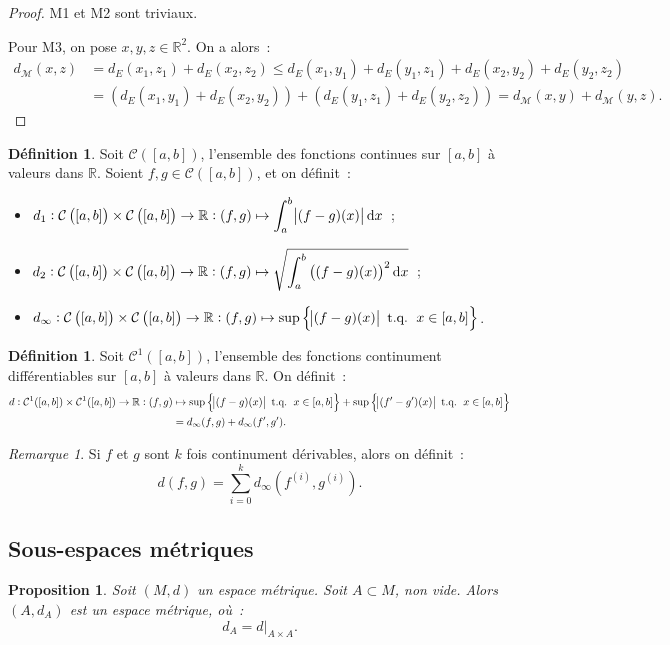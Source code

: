 \documentclass{report}
\newtheorem{prp}[thm]{Proposition}
\theoremstyle{definition}
\newtheorem{déf}[thm]{Définition}
\theoremstyle{remark}
\newtheorem*{rmq}{Remarque}
\DeclareMathOperator{\tq}{\text{ t.q. }}
\newcommand{\cont}[2]{\mathcal C\left(\left[#1, #2\right]\right)}
\newcommand{\restr}[2]{\left.#1\right|_{#2}}
\newcommand{\R}{\mathbb R}
\begin{document}
		\begin{proof} M1 et M2 sont triviaux.

		Pour M3, on pose $x, y, z \in \R^2$. On a alors~:
		\begin{align*}
			d_{\mathcal M}(x, z) &= d_E(x_1, z_1) + d_E(x_2, z_2) \leq d_E(x_1, y_1) + d_E(y_1, z_1) + d_E(x_2, y_2) + d_E(y_2, z_2) \\
			&= \left(d_E(x_1, y_1) + d_E(x_2, y_2)\right) + \left(d_E(y_1, z_1) + d_E(y_2, z_2)\right) = d_{\mathcal M}(x, y) + d_{\mathcal M}(y, z).
		\end{align*}
		\end{proof}

		\begin{déf} Soit $\cont ab$, l'ensemble des fonctions continues sur $[a, b]$ à valeurs dans $\R$. Soient $f, g \in \cont ab$, et on définit~:
		\begin{itemize}
			\item $d_1 : \cont ab \times \cont ab \to \R : (f, g) \mapsto \displaystyle\int_a^b\abs {(f-g)(x)}\dif x$~;
			\item $d_2 : \cont ab \times \cont ab \to \R : (f, g) \mapsto \displaystyle\sqrt{\int_a^b\left((f-g)(x)\right)^2\dif x}$~;
			\item $d_\infty : \cont ab \times \cont ab \to \R : (f, g) \mapsto \sup\left\{\abs {(f-g)(x)} \tq x \in [a, b]\right\}$.
		\end{itemize}
		\end{déf}

		\begin{déf} Soit $\mathcal C^1([a, b])$, l'ensemble des fonctions continument différentiables sur $[a, b]$ à valeurs dans $\R$. On définit~:
		\begin{align*}
			d : \mathcal C^1([a, b]) \times \mathcal C^1([a, b]) \to \R : (f, g) &\mapsto
			\sup\left\{\abs {(f-g)(x)} \tq x \in [a, b]\right\} + \sup\left\{\abs {(f'-g')(x)} \tq x \in [a, b]\right\} \\
			&= d_\infty(f, g) + d_\infty(f', g').
		\end{align*}
		\end{déf}

		\begin{rmq} Si $f$ et $g$ sont $k$ fois continument dérivables, alors on définit~:
		\[d(f, g) = \sum_{i=0}^kd_\infty(f^{(i)}, g^{(i)}).\]
		\end{rmq}

		\subsection{Sous-espaces métriques}
			\begin{prp} Soit $(M, d)$ un espace métrique. Soit $A \subset M$, non vide. Alors $(A, d_A)$ est un espace métrique, où~:
			\[d_A = \restr d{A \times A}.\]
			\end{prp}
\end{document}
